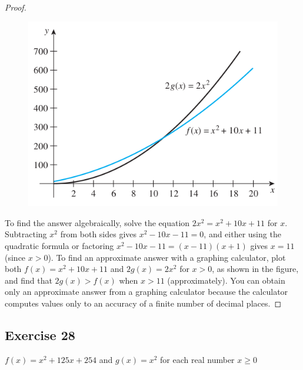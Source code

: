 \documentclass[14pt]{extarticle}
\begin{document}
\begin{proof}
\begin{figure}[ht!]
\centering
\includegraphics[scale=0.5]{../images/11.1.27.png}
\end{figure}

To find the answer algebraically, solve the equation \(2x^2 = x^2 + 10x + 11\) for \(x\). Subtracting \(x^2\) from both 
sides gives \(x^2 - 10x - 11 = 0\), and either using the quadratic formula or factoring \(x^2-10x-11=(x - 11)(x + 1)\) 
gives \(x = 11\) (since \(x > 0\)). To find an approximate answer with a graphing calculator, plot both \(f(x) = x^2 + 
10x + 11\) and \(2g(x) = 2x^2\) for \(x > 0\), as shown in the figure, and find that \(2g(x) > f(x)\) when \(x > 11\) 
(approximately). You can obtain only an approximate answer from a graphing calculator because the calculator computes 
values only to an accuracy of a finite number of decimal places.
\end{proof}

\subsection{Exercise 28}
\(f(x) = x^2 + 125x + 254\) and \(g(x) = x^2\) for each real number \(x \geq 0\)
\end{document}

